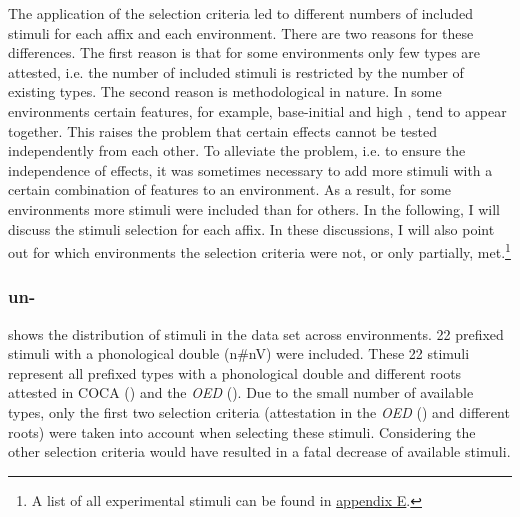  

The application of the selection criteria led to different numbers of included stimuli for each affix and each environment. 
There are two reasons for these differences. The first reason is that for some environments only few types are attested, i.e. the number of included stimuli is restricted by the number of existing types. The second reason is methodological in nature. 
In some environments 
certain features, for example, base-initial  and high , tend to appear together. This raises the problem that certain effects cannot be tested independently from each other. To alleviate the problem, i.e. to ensure the independence of effects, it was sometimes necessary to add more stimuli with a certain combination of features to an environment. As a result, for some environments more stimuli were included than for others. 
In the following, I will discuss the stimuli selection for each affix. In these discussions, I will also point out for which environments the selection criteria were not, or only partially, met.\footnote{A list of all experimental stimuli can be found in \hyperref[Appendix E: Stimuli of Experimental Study]{appendix E}.} 


\subsubsection{un-}

 shows the distribution of  stimuli in the data set across environments. 
22  prefixed stimuli with a phonological double ({n\#nV}) were included. These 22 stimuli represent all prefixed types with a phonological double and different roots attested in  {COCA} (\citealt{Davies.20082014}) and the \textit{OED} (\citealt{OED.2013}). 
Due to the small number of available types, only the first two selection criteria (attestation in the \textit{OED} (\citealt{OED.2013}) and different roots) were taken into account when selecting these stimuli. Considering the other selection criteria would have resulted in a fatal decrease of available stimuli. 



